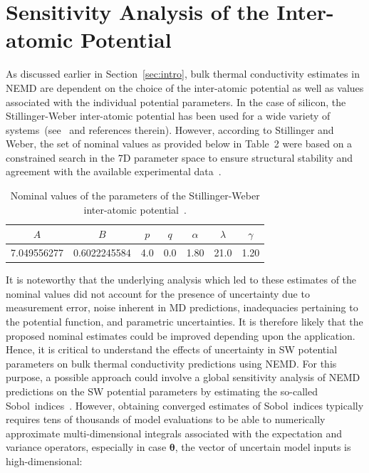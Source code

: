 \section{Sensitivity Analysis of the Inter-atomic Potential}
\label{sec:sense}

As discussed earlier in Section~\ref{sec:intro}, bulk thermal conductivity estimates in NEMD
are dependent on the choice of the inter-atomic potential as well as values associated with
the individual potential parameters. In the case of silicon, the Stillinger-Weber inter-atomic potential
has been used for a wide variety of 
systems~(see~\cite{Laradji:1995,Zhang:2014,Jiang:2015,Watanabe:1999,Zhou:2013} and references therein).
However, according to Stillinger and Weber, the set of nominal
values as provided below in Table~2 were based on a constrained search in the 7D parameter space
to ensure structural stability and agreement with the available experimental data~\cite{Stillinger:1985}.

\begin{table}[htbp]
\begin{center}
\begin{tabular}{|c|c|c|c|c|c|c|}
\hline 
$A$ & $B$ & $p$ & $q$ & $\alpha$ & $\lambda$ & $\gamma$ \\
\hline \hline
7.049556277 & 0.6022245584 & 4.0 & 0.0 & 1.80 & 21.0 & 1.20 \\
\hline
\end{tabular}
\end{center}
\caption{Nominal values of the parameters of the Stillinger-Weber inter-atomic
potential~\cite{Stillinger:1985}.}
\end{table}

It is noteworthy that the underlying analysis which led to these estimates of the nominal values did not
account for the presence of uncertainty due to
measurement error, noise inherent in MD predictions, inadequacies pertaining to the potential function,
and parametric uncertainties. It is therefore likely that the proposed nominal estimates could be 
improved depending upon the application. Hence, it is critical to understand the effects of uncertainty in
SW potential parameters on bulk thermal conductivity predictions using NEMD. For this purpose, a possible
approach could involve a global sensitivity analysis of NEMD predictions on the SW potential parameters 
by estimating the so-called Sobol\textquotesingle~indices~\cite{Sobol:2001}. However, obtaining converged estimates of
Sobol\textquotesingle~indices typically requires tens of thousands of model evaluations to be able to numerically approximate
multi-dimensional integrals associated with the expectation and variance operators, especially in case $\bm{\theta}$,
the vector of uncertain model inputs is high-dimensional:

